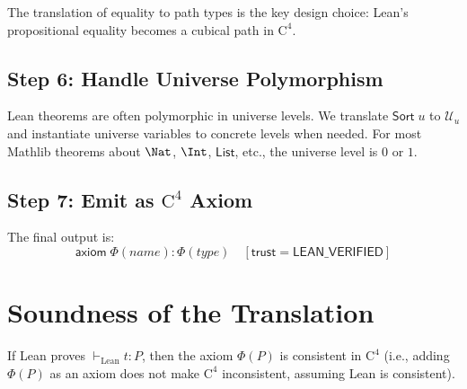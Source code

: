 \noindent
The translation of equality to path types is the key design choice:
Lean's propositional equality becomes a cubical path in $\mathrm{C}^4$.

\subsection{Step 6: Handle Universe Polymorphism}

Lean theorems are often polymorphic in universe levels.  We translate
$\mathsf{Sort}\;u$ to $\mathcal{U}_u$ and instantiate universe variables
to concrete levels when needed.  For most Mathlib theorems about $\Nat$,
$\Int$, $\mathsf{List}$, etc., the universe level is $0$ or $1$.

\subsection{Step 7: Emit as $\mathrm{C}^4$ Axiom}

The final output is:
\[
  \mathsf{axiom}\;\Phi(\mathit{name}) : \Phi(\mathit{type})
  \quad [\mathsf{trust} = \mathsf{LEAN\_VERIFIED}]
\]


\section{Soundness of the Translation}
\label{sec:translation-soundness}

\begin{theorem}
\label{thm:phi-soundness}
If Lean proves $\vdash_{\mathrm{Lean}} t : P$, then the axiom
$\Phi(P)$ is consistent in $\mathrm{C}^4$ (i.e., adding $\Phi(P)$
as an axiom does not make $\mathrm{C}^4$ inconsistent, assuming Lean
is consistent).
\end{theorem}


